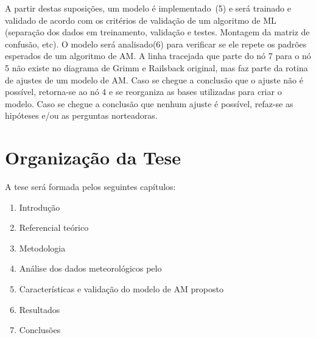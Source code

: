 A partir destas suposições, um modelo é implementado~(5) e será trainado e validado de acordo com os critérios de validação de um algoritmo de ML (separação dos dados em treinamento, validação e testes. Montagem da matriz de confusão, etc). O modelo será analisado(6) para verificar se ele repete os padrões esperados de um algoritmo de AM. A linha tracejada que parte do nó 7 para o nó 5 não existe no diagrama de Grimm e Railsback original, mas faz parte da rotina de ajustes de um modelo de AM. Caso se chegue a conclusão que o ajuste não é possível, retorna-se ao nó 4 e se reorganiza as bases utilizadas para criar o modelo. Caso se chegue a conclusão que nenhum ajuste é possível, refaz-se as hipóteses e/ou as perguntas norteadoras. 


\section{Organização da Tese}
\label{sec:organizacao}

A tese será formada pelos seguintes capítulos:
\begin{enumerate}
	\item Introdução
	\item Referencial teórico
	\item Metodologia
	\item Análise dos dados meteorológicos pelo \dmc
	\item Características e validação do modelo de AM proposto
	\item Resultados
	\item Conclusões
\end{enumerate}